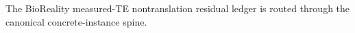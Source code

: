The BioReality measured-TE nontranslation residual ledger is routed through the canonical concrete-instance spine.

